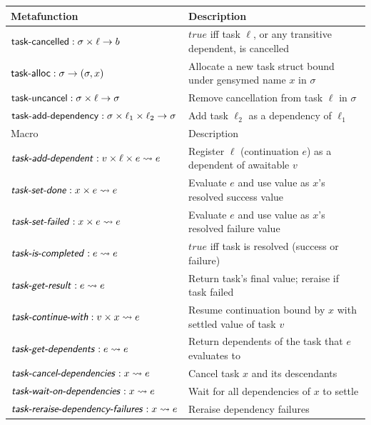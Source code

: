\begin{tabularx}{\linewidth}{@{}l>{\raggedright\arraybackslash}X@{}}
\toprule
Metafunction & Description \\
\midrule
$\text{\normalfont\textsf{task-cancelled}} : \sigma \times \ell \to b$ & $\mathit{true}$ iff task $\ell$, or any transitive dependent, is cancelled \\
$\text{\normalfont\textsf{task-alloc}} : \sigma \to (\sigma, x)$ & Allocate a new task struct bound under gensymed name $x$ in $\sigma$ \\
$\text{\normalfont\textsf{task-uncancel}} : \sigma \times \ell \to \sigma$ & Remove cancellation from task $\ell$ in $\sigma$ \\
$\text{\normalfont\textsf{task-add-dependency}} : \sigma \times \ell_1 \times \ell_2 \to \sigma$ & Add task $\ell_2$ as a dependency of $\ell_1$ \\
\midrule
Macro & Description \\
\midrule
$\textsf{\textit{task-add-dependent}} : v \times \ell \times e \rightsquigarrow e$ & Register $\ell$ (continuation $e$) as a dependent of awaitable $v$ \\
$\textsf{\textit{task-set-done}} : x \times e \rightsquigarrow e$ & Evaluate $e$ and use value as $x$'s resolved success value \\
$\textsf{\textit{task-set-failed}} : x \times e \rightsquigarrow e$ & Evaluate $e$ and use value as $x$'s resolved failure value \\
$\textsf{\textit{task-is-completed}} : e \rightsquigarrow e$ & $\mathit{true}$ iff task is resolved (success or failure) \\
$\textsf{\textit{task-get-result}} : e \rightsquigarrow e$ & Return task's final value; reraise if task failed \\
$\textsf{\textit{task-continue-with}} : v \times x \rightsquigarrow e$ & Resume continuation bound by $x$ with settled value of task $v$ \\
$\textsf{\textit{task-get-dependents}} : e \rightsquigarrow e$ & Return dependents of the task that $e$ evaluates to \\
$\textsf{\textit{task-cancel-dependencies}} : x \rightsquigarrow e$ & Cancel task $x$ and its descendants \\
$\textsf{\textit{task-wait-on-dependencies}} : x \rightsquigarrow e$ & Wait for all dependencies of $x$ to settle \\
$\textsf{\textit{task-reraise-dependency-failures}} : x \rightsquigarrow e$ & Reraise dependency failures \\
\bottomrule
\end{tabularx}
